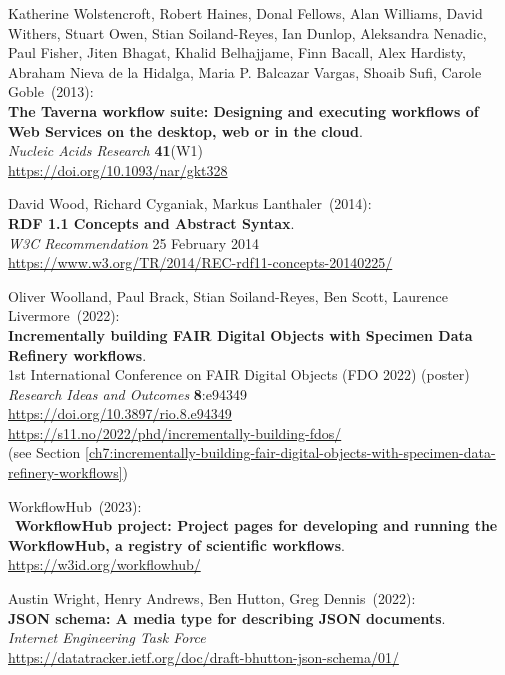 \begin{thebibliography}{9}
Katherine Wolstencroft, Robert Haines, Donal Fellows, Alan Williams, David Withers, Stuart Owen, Stian Soiland-Reyes, Ian Dunlop, Aleksandra Nenadic, Paul Fisher, Jiten Bhagat, Khalid Belhajjame, Finn Bacall, Alex Hardisty, Abraham Nieva de la Hidalga, Maria P. Balcazar Vargas, Shoaib Sufi, Carole Goble~(2013): \\
\textbf{The {Taverna} workflow suite: Designing
and executing workflows of {Web Services} on the desktop, web or in the
cloud}. \\
\emph{Nucleic Acids Research} \textbf{41}(W1) \\
\url{https://doi.org/10.1093/nar/gkt328}

David Wood, Richard Cyganiak, Markus Lanthaler~(2014): \\
\textbf{RDF 1.1 Concepts and Abstract Syntax}.\\
\emph{W3C Recommendation} 25 February 2014\\
\url{https://www.w3.org/TR/2014/REC-rdf11-concepts-20140225/}

Oliver Woolland, Paul Brack, Stian Soiland-Reyes, Ben Scott, Laurence Livermore~(2022): \\
\textbf{Incrementally building FAIR Digital Objects with Specimen Data Refinery workflows}.\\
1st International Conference on FAIR Digital Objects
(FDO 2022) (poster)\\
\emph{Research Ideas and Outcomes} \textbf{8}:e94349\\
\url{https://doi.org/10.3897/rio.8.e94349}\\
\url{https://s11.no/2022/phd/incrementally-building-fdos/}\\
(see Section \vref{ch7:incrementally-building-fair-digital-objects-with-specimen-data-refinery-workflows})

WorkflowHub~(2023): \\
~\textbf{WorkflowHub project: Project pages for developing and running the WorkflowHub, a registry of scientific workflows}.\\
\url{https://w3id.org/workflowhub/}

Austin Wright, Henry Andrews, Ben Hutton, Greg Dennis~(2022): \\
\textbf{JSON schema: A media type for describing JSON documents}.\\
\emph{Internet Engineering Task Force}\\
\url{https://datatracker.ietf.org/doc/draft-bhutton-json-schema/01/}


\end{thebibliography}

